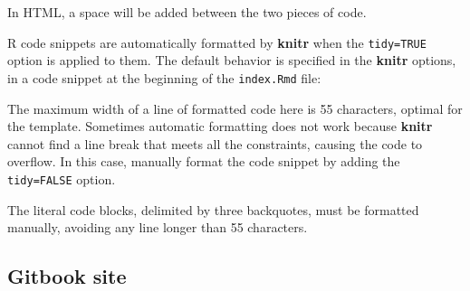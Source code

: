 \documentclass[
  12pt,
  american,
  a4paper,
  extrafontsizes,onecolumn,openright
  ]{memoir}
\newenvironment{Shaded}{\begin{snugshade}}{\end{snugshade}}
\newcommand{\AttributeTok}[1]{\textcolor[rgb]{0.77,0.63,0.00}{#1}}
\newcommand{\CommentTok}[1]{\textcolor[rgb]{0.56,0.35,0.01}{\textit{#1}}}
\newcommand{\ConstantTok}[1]{\textcolor[rgb]{0.00,0.00,0.00}{#1}}
\newcommand{\DecValTok}[1]{\textcolor[rgb]{0.00,0.00,0.81}{#1}}
\newcommand{\FunctionTok}[1]{\textcolor[rgb]{0.00,0.00,0.00}{#1}}
\newcommand{\NormalTok}[1]{#1}
\newcommand{\SpecialCharTok}[1]{\textcolor[rgb]{0.00,0.00,0.00}{#1}}
\newcommand{\StringTok}[1]{\textcolor[rgb]{0.31,0.60,0.02}{#1}}
\newlength{\rf}
\begin{document}
In HTML, a space will be added between the two pieces of code.

R code snippets are automatically formatted by \textbf{knitr} when the \texttt{tidy=TRUE} option is applied to them.
The default behavior is specified in the \textbf{knitr} options, in a code snippet at the beginning of the \texttt{index.Rmd} file:

\scriptsize

\begin{Shaded}
\end{Shaded}

\normalsize

The maximum width of a line of formatted code here is 55 characters, optimal for the template.
Sometimes automatic formatting does not work because \textbf{knitr} cannot find a line break that meets all the constraints, causing the code to overflow.
In this case, manually format the code snippet by adding the \texttt{tidy=FALSE} option.

The literal code blocks, delimited by three backquotes, must be formatted manually, avoiding any line longer than 55 characters.

\hypertarget{gitbook-site}{%
\subsection{Gitbook site}\label{gitbook-site}}
\end{document}

